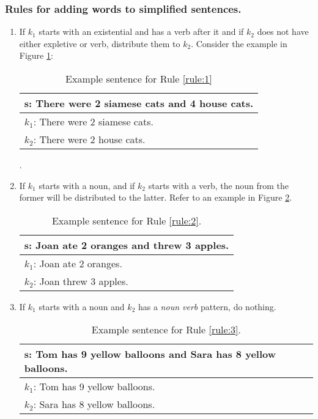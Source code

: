\documentclass[11pt]{article}
\begin{document}
\subsubsection{Rules for adding words to simplified sentences.}\label{sec:secondsentencesimplification}
\begin{enumerate}[topsep=0pt,itemsep=-1ex,partopsep=1ex,parsep=1ex]
\item \label{rule:1}
If $\mathit{k_{1}}$ starts with an existential and has a verb after it and if $\mathit{k_{2}}$ does not have either expletive or verb, distribute them to $\mathit{k_{2}}$. Consider the example in Figure \ref{figure:3}:

\begin{table}[h!]
\centering
\begin{tabular}{ | m{7cm} | }
\hline
 $\mathbf{s}$\textbf{: There were 2 siamese cats and 4 house cats.}\\
\hline
$\mathit{k_{1}}$: There were 2 siamese cats.\\
\hline
$\mathit{k_{2}}$: There were 2 house cats.\\
\hline
\end{tabular}
\caption{Example sentence for Rule \ref{rule:1}}.
\label{figure:3}
\end{table}

\item \label{rule:2}
If $\mathit{k_{1}}$ starts with a noun, and if $\mathit{k_{2}}$ starts with a verb, the noun from the former will be distributed to the latter. Refer to an example in Figure \ref{figure:4}.

\begin{table}[h!]
\centering
\begin{tabular}{ | m{7cm} | }
\hline
 $\mathbf{s}$\textbf{: Joan ate 2 oranges and threw 3 apples.}\\
\hline
$\mathit{k_{1}}$: Joan ate 2 oranges.\\
\hline
$\mathit{k_{2}}$: Joan threw 3 apples.\\
\hline
\end{tabular}
\caption{Example sentence for Rule \ref{rule:2}.}
\label{figure:4}
\end{table}

\item  \label{rule:3}
If $\mathit{k_{1}}$ starts with a noun and $\mathit{k_{2}}$ has a \textit{noun verb} pattern, do nothing.

\begin{table}[h!]
\centering
\begin{tabular}{ | m{7cm} | }
\hline
 $\mathbf{s}$\textbf{: Tom has 9 yellow balloons and Sara has 8 yellow balloons.}\\
\hline
$\mathit{k_{1}}$: Tom has 9 yellow balloons.\\
\hline
$\mathit{k_{2}}$: Sara has 8 yellow balloons.\\
\hline
\end{tabular}
\caption{Example sentence for Rule  \ref{rule:3}.}
\label{figure:5}
\end{table}


\end{enumerate}
\end{document}
